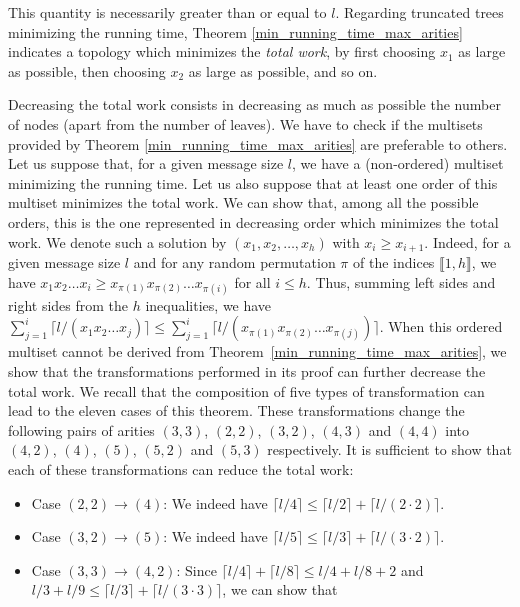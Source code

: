 \documentclass{llncs}
\begin{document}
This quantity is necessarily greater than or equal to $l$. Regarding truncated trees minimizing the running time, 
Theorem \ref{min_running_time_max_arities} indicates a topology which minimizes the \emph{total work}, by first choosing $x_1$ as large as possible, 
then choosing $x_2$ as large as possible, and so on.

\begin{remark}
 Decreasing the total work consists in decreasing as much as possible the number of nodes (apart from the number of leaves). We have to
 check if the multisets provided by Theorem \ref{min_running_time_max_arities} are preferable to others.
 Let us suppose that, for a given message size $l$, we have a (non-ordered) multiset minimizing
 the running time.
 Let us also suppose  that at least one order of this multiset minimizes the total work.
We can show that, among all the possible orders, this is the one represented in decreasing order
 which minimizes the total work. 
 We denote such a solution by $(x_1,x_2, \ldots, x_h)$ with $x_i \geq x_{i+1}$.
 Indeed, for a given message size $l$ and for any random permutation $\pi$ of the indices $\llbracket 1,h \rrbracket$, we have 
 $x_1 x_2 \ldots x_i  \geq x_{\pi(1)} x_{\pi(2)} \ldots x_{\pi(i)}$ for all $i \leq h$. Thus, summing left sides and right sides from the $h$
 inequalities, we have $\sum_{j=1}^i \lceil l/(x_1 x_2 \ldots x_j) \rceil \leq \sum_{j=1}^i \lceil l/(x_{\pi(1)} x_{\pi(2)} \ldots x_{\pi(j)}) \rceil$.
 When this ordered multiset cannot be derived from Theorem~\ref{min_running_time_max_arities}, we show that the transformations performed in its proof
 can further decrease the total work. We recall that the composition of five types of transformation 
 can lead to the eleven cases of this theorem. These transformations change the following pairs of arities $(3,3)$, $(2,2)$, $(3,2)$, $(4,3)$ and $(4,4)$ 
 into $(4,2)$, $(4)$, $(5)$, $(5,2)$ and $(5,3)$ respectively.
 It is sufficient to show that each of these transformations can reduce the total work:
 \begin{itemize}
  \item Case $(2,2) \rightarrow (4)$: We indeed have $\lceil l/4 \rceil \leq \lceil l/2 \rceil + \lceil l/(2 \cdot 2) \rceil$.
  \item Case $(3,2) \rightarrow (5)$: We indeed have $\lceil l/5 \rceil \leq \lceil l/3 \rceil + \lceil l/(3 \cdot 2) \rceil$.
  \item Case $(3,3) \rightarrow (4,2)$: Since $\lceil l/4 \rceil + \lceil l/8 \rceil \leq l/4 + l/8 + 2$ 
  and $l/3 + l/9 \leq \lceil l/3 \rceil + \lceil l/(3 \cdot 3) \rceil$, we can show that

\end{itemize}
\end{remark}
\end{document}
